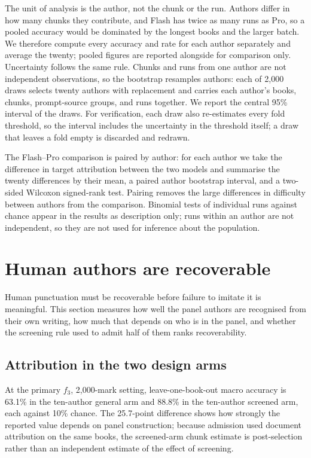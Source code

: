\documentclass[11pt]{article}
\newcommand{\fThree}{\ensuremath{f_3}\xspace}
\begin{document}
The unit of analysis is the author, not the chunk or the run.  Authors
differ in how many chunks they contribute, and Flash has twice as many
runs as Pro, so a pooled accuracy would be dominated by the longest books
and the larger batch.  We therefore compute every accuracy and rate for
each author separately and average the twenty; pooled figures are
reported alongside for comparison only.  Uncertainty follows the same rule.
Chunks and runs from one author are not independent observations, so the
bootstrap resamples authors: each of 2,000 draws selects twenty authors
with replacement and carries each author's books, chunks, prompt-source
groups, and runs together.  We report the central 95\% interval of the
draws.  For verification, each draw also re-estimates every fold
threshold, so the interval includes the uncertainty in the threshold
itself; a draw that leaves a fold empty is discarded and redrawn.

The Flash--Pro comparison is paired by author: for each author we take
the difference in target attribution between the two models and summarise
the twenty differences by their mean, a paired author bootstrap interval,
and a two-sided Wilcoxon signed-rank test.  Pairing removes the large
differences in difficulty between authors from the comparison.  Binomial
tests of individual runs against chance appear in the results as
description only; runs within an author are not independent, so they are
not used for inference about the population.

\section{Human authors are recoverable}
\label{sec:human}

Human punctuation must be recoverable before failure to imitate it is
meaningful.  This section measures how well the panel authors are
recognised from their own writing, how much that depends on who is in the
panel, and whether the screening rule used to admit half of them ranks
recoverability.

\subsection{Attribution in the two design arms}

At the primary \fThree, 2,000-mark setting, leave-one-book-out
macro accuracy is 63.1\% in the ten-author general arm and 88.8\% in the
ten-author screened arm, each against 10\% chance.  The 25.7-point difference
shows how strongly the reported value depends on panel construction; because
admission used document attribution on the same books, the screened-arm chunk
estimate is post-selection rather than an independent estimate of the effect
of screening.
\end{document}
